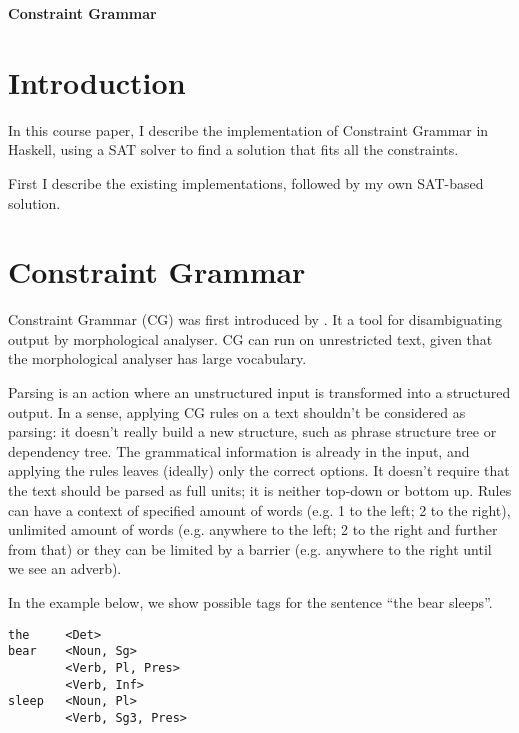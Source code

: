 \documentclass[a4paper, 11pt]{article}
\begin{document}
\lstset{language=Haskell}
\pagestyle{fancy}
\lhead{\textcolor{gray}{Inari Listenmaa}}
\chead{\textcolor{gray}{\bf Grammar Formalisms}}
\rhead{\textcolor{gray}{LP2 2014}}
\lfoot{\textcolor{gray}{}}
\rfoot{\thepage}
\renewcommand{\headrulewidth}{0.5pt} 
\renewcommand{\footrulewidth}{0.5pt} 
\fancyfoot[C]{\footnotesize \textcolor{gray}{}} 

\centerline{ {\Large \bf Constraint Grammar} }
\vspace*{0.2cm}

\section{Introduction}

In this course paper, I describe the implementation of Constraint Grammar in Haskell, using a SAT solver to find a solution that fits all the constraints.

First I describe the existing implementations, followed by my own SAT-based solution.

\section{Constraint Grammar}

Constraint Grammar (CG) was first introduced by \cite{KarlssonTODO}. 
It a tool for disambiguating output by morphological analyser.
CG can run on unrestricted text, given that the morphological analyser
has large vocabulary.

Parsing is an action where an unstructured input is transformed into a
structured output. In a sense, applying CG rules on a text shouldn't
be considered as parsing: it doesn't really build a new structure,
such as phrase structure tree or dependency tree.
The grammatical information is already in the input, and applying the
rules leaves (ideally) only the correct options. 
It doesn't require that the text should be parsed as full units; it is
neither top-down or bottom up. Rules can have a context of specified
amount of words (e.g. 1 to the left; 2 to the right), unlimited amount
of words (e.g. anywhere to the left; 2 to the right and further from
that) or they can be limited by a barrier (e.g. anywhere to the right
until we see an adverb).

In the example below, we show possible tags for the sentence ``the bear sleeps''.

\begin{lstlisting}
the     <Det>
bear    <Noun, Sg>
        <Verb, Pl, Pres>
        <Verb, Inf>
sleep   <Noun, Pl>
        <Verb, Sg3, Pres>
\end{lstlisting}
\end{document}
